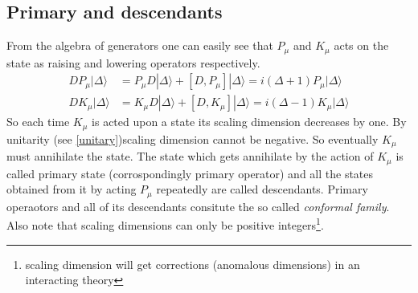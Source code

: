 \documentclass[12pt,a4paper,oneside]{book}
\theoremstyle{definition}
\begin{document}
    \subsection*{Primary and descendants}
        From the algebra of generators one can easily see that $P_{\mu}$ and $K_{\mu}$ acts on the state as raising and lowering operators respectively.
        \begin{align}
            DP_{\mu}|\Delta\rangle &= P_{\mu}D|\Delta\rangle + [D,P_{\mu}]|\Delta\rangle = i(\Delta+1)P_{\mu}|\Delta\rangle\nonumber\\
            DK_{\mu}|\Delta\rangle &= K_{\mu}D|\Delta\rangle + [D,K_{\mu}]|\Delta\rangle = i(\Delta-1)K_{\mu}|\Delta\rangle
        \end{align}
        So each time $K_{\mu}$ is acted upon a state its scaling dimension decreases by one. By unitarity (see \ref{unitary})scaling dimension cannot be negative. So eventually $K_{\mu}$ must annihilate the state. The state which gets annihilate by the action of $K_{\mu}$ is called primary state (corrospondingly primary operator) and all the states obtained from it by acting $P_{\mu}$ repeatedly are called descendants. Primary operaotors and all of its descendants consitute the so called \emph{conformal family}. Also note that scaling dimensions can only be positive integers\footnote{scaling dimension will get corrections (anomalous dimensions) in an interacting theory}.
\end{document}
